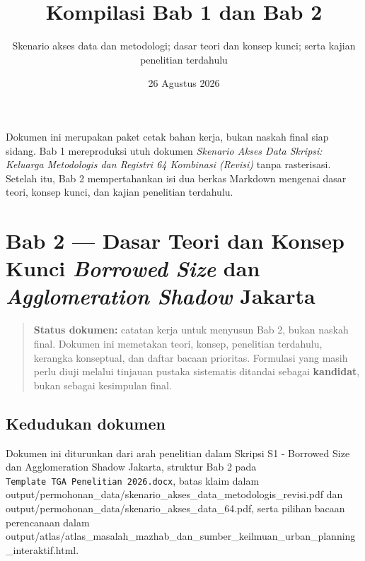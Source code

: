\documentclass[
  indonesian,
  11pt,
  a4paper,
  oneside,
  openany]{report}
\title{Kompilasi Bab 1 dan Bab 2}
\subtitle{Skenario akses data dan metodologi; dasar teori dan konsep
kunci; serta kajian penelitian terdahulu}
\author{}
\date{26 Agustus 2026}
\begin{document}
\maketitle

\begin{tcolorbox}[title={Status kompilasi}]
Dokumen ini merupakan paket cetak bahan kerja, bukan naskah final siap sidang. Bab 1 mereproduksi utuh dokumen \emph{Skenario Akses Data Skripsi: Keluarga Metodologis dan Registri 64 Kombinasi (Revisi)} tanpa rasterisasi. Setelah itu, Bab 2 mempertahankan isi dua berkas Markdown mengenai dasar teori, konsep kunci, dan kajian penelitian terdahulu.
\end{tcolorbox}
\clearpage


\renewcommand*\contentsname{Daftar Isi}
{
\setcounter{tocdepth}{0}
\tableofcontents
}
\clearpage

\clearpage

\chapter{\texorpdfstring{Bab 2 --- Dasar Teori dan Konsep Kunci
\emph{Borrowed Size} dan \emph{Agglomeration Shadow}
Jakarta}{Bab 2 --- Dasar Teori dan Konsep Kunci Borrowed Size dan Agglomeration Shadow Jakarta}}\label{bab-2-dasar-teori-dan-konsep-kunci-borrowed-size-dan-agglomeration-shadow-jakarta}

\begin{quote}
\textbf{Status dokumen:} catatan kerja untuk menyusun Bab 2, bukan
naskah final. Dokumen ini memetakan teori, konsep, penelitian terdahulu,
kerangka konseptual, dan daftar bacaan prioritas. Formulasi yang masih
perlu diuji melalui tinjauan pustaka sistematis ditandai sebagai
\textbf{kandidat}, bukan sebagai kesimpulan final.
\end{quote}

\section{Kedudukan dokumen}\label{kedudukan-dokumen}

Dokumen ini diturunkan dari arah penelitian dalam Skripsi S1 - Borrowed
Size dan Agglomeration Shadow Jakarta, struktur Bab 2 pada
\texttt{Template\ TGA\ Penelitian\ 2026.docx}, batas klaim dalam
output/permohonan_data/skenario_akses_data_metodologis_revisi.pdf dan
output/permohonan_data/skenario_akses_data_64.pdf, serta pilihan bacaan perencanaan
dalam output/atlas/atlas_masalah_mazhab_dan_sumber_keilmuan_urban_planning_interaktif.html.
\end{document}
